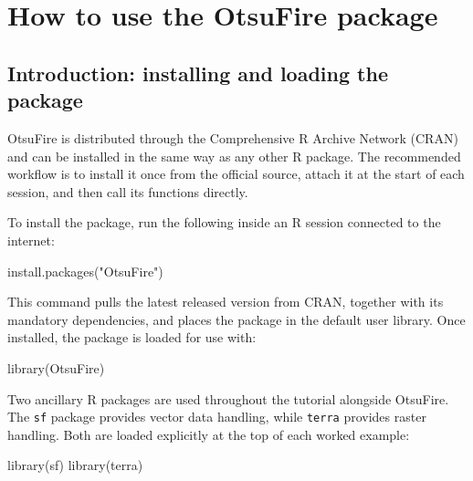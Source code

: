 \documentclass[
  british,
  a4paper,
]{scrbook}
\newenvironment{Shaded}{\begin{snugshade}}{\end{snugshade}}
\newcommand{\FunctionTok}[1]{\textcolor[rgb]{0.28,0.35,0.67}{#1}}
\newcommand{\NormalTok}[1]{\textcolor[rgb]{0.00,0.23,0.31}{#1}}
\newcommand{\StringTok}[1]{\textcolor[rgb]{0.13,0.47,0.30}{#1}}
\begin{document}

\chapter{How to use the OtsuFire
package}\label{how-to-use-the-otsufire-package}

\section{Introduction: installing and loading the
package}\label{introduction-installing-and-loading-the-package}

OtsuFire is distributed through the Comprehensive R Archive Network
(CRAN) and can be installed in the same way as any other R package. The
recommended workflow is to install it once from the official source,
attach it at the start of each session, and then call its functions
directly.

To install the package, run the following inside an R session connected
to the internet:

\begin{Shaded}
\begin{Highlighting}[]
\FunctionTok{install.packages}\NormalTok{(}\StringTok{"OtsuFire"}\NormalTok{)}
\end{Highlighting}
\end{Shaded}

This command pulls the latest released version from CRAN, together with
its mandatory dependencies, and places the package in the default user
library. Once installed, the package is loaded for use with:

\begin{Shaded}
\begin{Highlighting}[]
\FunctionTok{library}\NormalTok{(OtsuFire)}
\end{Highlighting}
\end{Shaded}

Two ancillary R packages are used throughout the tutorial alongside
OtsuFire. The \texttt{sf} package provides vector data handling, while
\texttt{terra} provides raster handling. Both are loaded explicitly at
the top of each worked example:

\begin{Shaded}
\begin{Highlighting}[]
\FunctionTok{library}\NormalTok{(sf)}
\FunctionTok{library}\NormalTok{(terra)}
\end{Highlighting}
\end{Shaded}
\end{document}
